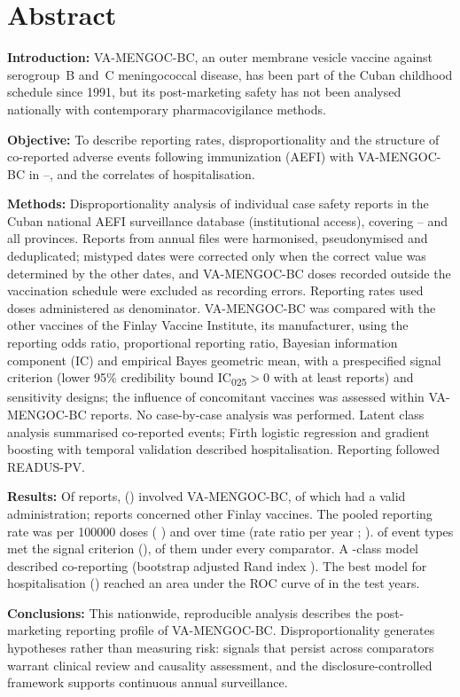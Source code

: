 \documentclass[11pt]{article}
\begin{document}
\section*{Abstract}
\noindent\textbf{Introduction:} VA-MENGOC-BC, an outer membrane vesicle vaccine against
serogroup~B and~C meningococcal disease, has been part of the Cuban childhood schedule since
1991, but its post-marketing safety has not been analysed nationally with contemporary
pharmacovigilance methods.\par
\noindent\textbf{Objective:} To describe reporting rates, disproportionality and the structure of
co-reported adverse events following immunization (AEFI) with VA-MENGOC-BC in
\VStudyFirstYear--\VStudyLastYear, and the correlates of hospitalisation.\par
\noindent\textbf{Methods:} Disproportionality analysis of individual case safety reports in the
Cuban national AEFI surveillance database (institutional access), covering
\VStudyFirstYear--\VStudyLastYear{} and all provinces. Reports from \VNFiles{} annual files were
harmonised, pseudonymised and deduplicated; mistyped dates were corrected only when the correct
value was determined by the other dates, and \PONScheduleInvalid{} VA-MENGOC-BC doses recorded
outside the vaccination schedule were excluded as recording errors. Reporting rates used doses
administered as denominator. VA-MENGOC-BC was compared with the other vaccines of the Finlay
Vaccine Institute, its manufacturer, using the reporting odds ratio, proportional reporting ratio,
Bayesian information component (IC) and empirical Bayes geometric mean, with a prespecified
signal criterion (lower 95\% credibility bound IC\textsubscript{025}${}>0$ with at least
\PODispMinReports{} reports) and sensitivity designs; the influence of concomitant vaccines was
assessed within VA-MENGOC-BC reports. No case-by-case analysis was performed. Latent class analysis summarised co-reported events; Firth logistic
regression and gradient boosting with temporal validation described hospitalisation. Reporting
followed READUS-PV.\par
\noindent\textbf{Results:} Of \VReportsInWindow{} reports, \PONTargetAll{} (\POPctTargetAll) involved
VA-MENGOC-BC, of which \PONTargetAnalysed{} had a valid administration; \PONFinlayComparator{}
reports concerned other Finlay vaccines. The pooled reporting rate was \POPooledRate{} per \num{100000} doses
(\CI{} \POPooledRateCI) and \POTrendWord{} over time (rate ratio per year \POTrendRR; \CI{}
\POTrendRRCI). \POSignalsPrimaryFinlayVaccines{} of \PONEventsScreened{} event types met the
signal criterion (\POSignalList), \PONSignalsRobust{} of them under every comparator. A
\POLCABestK-class model described co-reporting (bootstrap adjusted Rand index \POLCAAri). The
best model for hospitalisation (\POBestModel) reached an area under the ROC curve of
\POBestAuroc{} in the test years.\par
\noindent\textbf{Conclusions:} This nationwide, reproducible analysis describes the post-marketing
reporting profile of VA-MENGOC-BC. Disproportionality generates hypotheses rather than measuring
risk: signals that persist across comparators warrant clinical review and causality assessment,
and the disclosure-controlled framework supports continuous annual surveillance.
\end{document}
